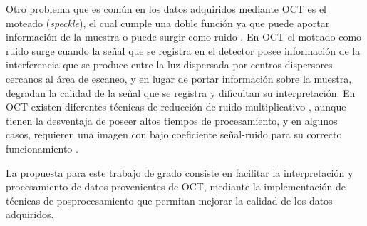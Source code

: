 Otro problema que es común en los datos adquiridos mediante OCT es el moteado (\textit{speckle}), el cual cumple una doble función ya que puede aportar información de la muestra o puede surgir como ruido \cite{Schmitt1999,Mariampillai2008}. En OCT el moteado como ruido surge cuando la señal que se registra en el detector posee información de la interferencia que se produce entre la luz dispersada por centros dispersores cercanos al área de escaneo, y en lugar de portar información sobre la muestra, degradan la calidad de la señal que se registra y dificultan su interpretación. En OCT existen diferentes técnicas de reducción de ruido multiplicativo \cite{Hughes2009,Szkulmowski2012,Aum2015}, aunque tienen la desventaja de poseer altos tiempos de procesamiento, y en algunos casos, requieren una imagen con bajo coeficiente señal-ruido para su correcto funcionamiento \cite{Fang2012}.

La propuesta para este trabajo de grado consiste en facilitar la interpretación y procesamiento de datos provenientes de OCT, mediante la implementación de técnicas de posprocesamiento que permitan mejorar la calidad de los datos adquiridos.